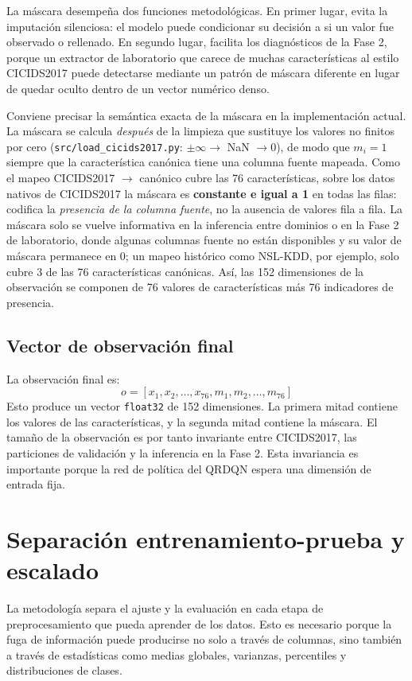 La máscara desempeña dos funciones metodológicas. En primer lugar, evita la imputación silenciosa: el modelo puede condicionar su decisión a si un valor fue observado o rellenado. En segundo lugar, facilita los diagnósticos de la Fase 2, porque un extractor de laboratorio que carece de muchas características al estilo CICIDS2017 puede detectarse mediante un patrón de máscara diferente en lugar de quedar oculto dentro de un vector numérico denso.

Conviene precisar la semántica exacta de la máscara en la implementación actual. La máscara se calcula \emph{después} de la limpieza que sustituye los valores no finitos por cero (\texttt{src/load\_cicids2017.py}: $\pm\infty \to$ NaN $\to 0$), de modo que $m_i = 1$ siempre que la característica canónica tiene una columna fuente mapeada. Como el mapeo CICIDS2017 $\to$ canónico cubre las 76 características, sobre los datos nativos de CICIDS2017 la máscara es \textbf{constante e igual a 1} en todas las filas: codifica la \emph{presencia de la columna fuente}, no la ausencia de valores fila a fila. La máscara solo se vuelve informativa en la inferencia entre dominios o en la Fase 2 de laboratorio, donde algunas columnas fuente no están disponibles y su valor de máscara permanece en 0; un mapeo histórico como NSL-KDD, por ejemplo, solo cubre 3 de las 76 características canónicas. Así, las 152 dimensiones de la observación se componen de 76 valores de características más 76 indicadores de presencia.

\subsection{Vector de observación final}
La observación final es:
\[
    o = [x_1, x_2, \dots, x_{76}, m_1, m_2, \dots, m_{76}]
\]
Esto produce un vector \texttt{float32} de 152 dimensiones. La primera mitad contiene los valores de las características, y la segunda mitad contiene la máscara. El tamaño de la observación es por tanto invariante entre CICIDS2017, las particiones de validación y la inferencia en la Fase 2. Esta invariancia es importante porque la red de política del QRDQN espera una dimensión de entrada fija.

\section{Separación entrenamiento-prueba y escalado}
La metodología separa el ajuste y la evaluación en cada etapa de preprocesamiento que pueda aprender de los datos. Esto es necesario porque la fuga de información puede producirse no solo a través de columnas, sino también a través de estadísticas como medias globales, varianzas, percentiles y distribuciones de clases.


